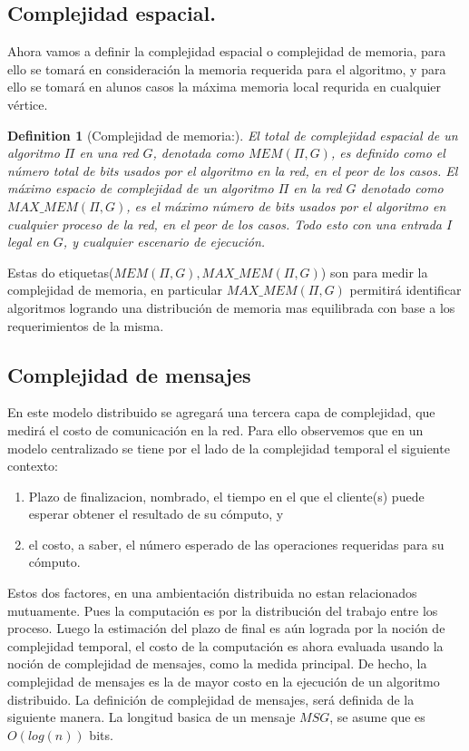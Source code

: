 \documentclass[10pt]{report}
\newtheorem{definition}{Definition}
\begin{document}
    \subsection{Complejidad espacial.}\label{subsec:complejidad-espacial.}
    Ahora vamos a definir la complejidad espacial o complejidad de memoria,
        para ello se tomará en consideración la memoria requerida para el algoritmo, y para ello se tomará en alunos casos
    la máxima memoria local requrida en cualquier vértice.

    \begin{definition}
        [Complejidad de memoria:] El total de complejidad espacial de un algoritmo $\Pi$ en una red $G$, denotada como
        $MEM(\Pi, G)$, es definido como el número total de bits usados por el algoritmo en la red, en el peor de los casos.
        El máximo espacio de complejidad de un algoritmo $\Pi$ en la red $G$ denotado como $MAX\_MEM(\Pi, G)$, es el máximo
        número de bits usados por el algoritmo en cualquier proceso de la red, en el peor de los casos.
        Todo esto con una entrada $I$ legal en $G$, y cualquier escenario de ejecución.
    \end{definition}

    Estas do etiquetas($MEM(\Pi,G),MAX\_MEM(\Pi,G)$) son para medir la complejidad de memoria, en particular $MAX\_MEM(\Pi, G)$ permitirá identificar algoritmos
    logrando una distribución de memoria mas equilibrada con base a los requerimientos de la misma.

    \subsection{Complejidad de mensajes}\label{subsec:complejidad-de-mensajes}
    En este modelo distribuido se agregará una tercera capa de complejidad, que medirá el costo de comunicación en la red.
    Para ello observemos que en un modelo centralizado se tiene por el lado de la complejidad temporal el siguiente contexto:\newline
    \begin{enumerate}
        \item Plazo de finalizacion, nombrado, el tiempo en el que el cliente(s) puede esperar obtener el resultado de su cómputo, y
        \item el costo, a saber, el número esperado de las operaciones requeridas para su cómputo.
    \end{enumerate}
    Estos dos factores, en una ambientación distribuida no estan relacionados mutuamente.
    Pues la computación es por la distribución del trabajo entre los proceso.
    Luego la estimación del plazo de final es aún lograda por la noción de complejidad temporal,
    el costo de la computación es ahora evaluada usando la noción de complejidad de mensajes, como la medida principal.\newline
    De hecho, la complejidad de mensajes es la de mayor costo en la ejecución de un algoritmo distribuido.
    \newline
    La definición de complejidad de mensajes, será definida de la siguiente manera.\newline
    La longitud basica de un mensaje $MSG$, se asume que es $O(log(n))$ bits.
\end{document}
